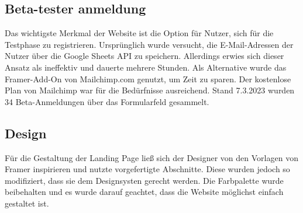 \subsection{Beta-tester anmeldung}
Das wichtigste Merkmal der Website ist die Option für Nutzer, sich für die Testphase zu registrieren. Ursprünglich wurde versucht, die E-Mail-Adressen der Nutzer über die Google Sheets API zu speichern. Allerdings erwies sich dieser Ansatz als ineffektiv und dauerte mehrere Stunden. Als Alternative wurde das Framer-Add-On von Mailchimp.com genutzt, um Zeit zu sparen. Der kostenlose Plan von Mailchimp war für die Bedürfnisse ausreichend. Stand 7.3.2023 wurden 34 Beta-Anmeldungen über das Formularfeld gesammelt.


\subsection{Design}
Für die Gestaltung der Landing Page ließ sich der Designer
von den Vorlagen von Framer inspirieren und nutzte
vorgefertigte Abschnitte. Diese wurden jedoch so
modifiziert, dass sie dem Designsysten gerecht werden. Die
Farbpalette wurde beibehalten und es wurde darauf geachtet,
dass die Website möglichst einfach gestaltet ist.

